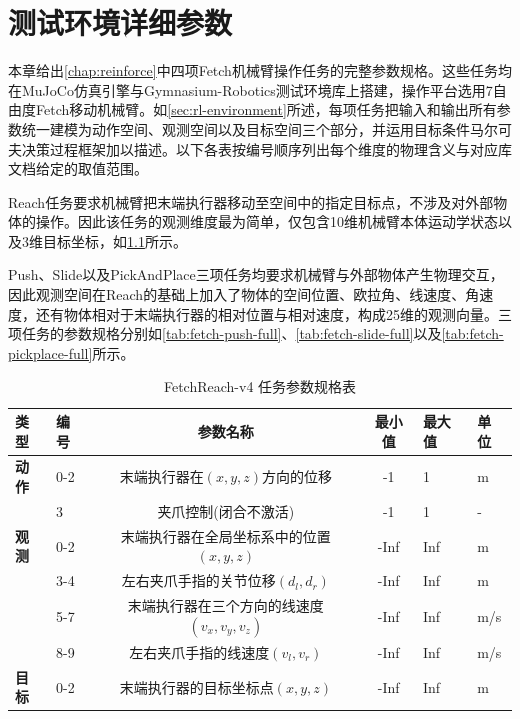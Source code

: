 \chapter{测试环境详细参数}\label{chap:detail-env}

本章给出\cref{chap:reinforce}中四项Fetch机械臂操作任务的完整参数规格。这些任务均在MuJoCo仿真引擎与Gymnasium-Robotics测试环境库上搭建，操作平台选用7自由度Fetch移动机械臂。如\cref{sec:rl-environment}所述，每项任务把输入和输出所有参数统一建模为动作空间、观测空间以及目标空间三个部分，并运用目标条件马尔可夫决策过程框架加以描述。以下各表按编号顺序列出每个维度的物理含义与对应库文档给定的取值范围。

Reach任务要求机械臂把末端执行器移动至空间中的指定目标点，不涉及对外部物体的操作。因此该任务的观测维度最为简单，仅包含10维机械臂本体运动学状态以及3维目标坐标，如\cref{tab:fetch-reach-full}所示。

Push、Slide以及PickAndPlace三项任务均要求机械臂与外部物体产生物理交互，因此观测空间在Reach的基础上加入了物体的空间位置、欧拉角、线速度、角速度，还有物体相对于末端执行器的相对位置与相对速度，构成25维的观测向量。三项任务的参数规格分别如\cref{tab:fetch-push-full}、\cref{tab:fetch-slide-full}以及\cref{tab:fetch-pickplace-full}所示。
\begin{table}[!htb]
  \caption{FetchReach-v4 任务参数规格表}\label{tab:fetch-reach-full}
  \centering
  \small
  \begin{tabular}{@{} llccll @{}} \toprule
    \textbf{类型} & \textbf{编号} & \textbf{参数名称} & \textbf{最小值} & \textbf{最大值} & \textbf{单位} \\ \midrule
    \textbf{动作} & 0-2 & 末端执行器在$(x, y, z)$方向的位移 & -1 & 1 & m \\
    & 3 & 夹爪控制(闭合不激活) & -1 & 1 & - \\ \midrule
    \textbf{观测} & 0-2 & 末端执行器在全局坐标系中的位置$(x, y, z)$ & -Inf & Inf & m \\
     & 3-4 & 左右夹爪手指的关节位移$(d_l, d_r)$ & -Inf & Inf & m \\
    & 5-7 & 末端执行器在三个方向的线速度$(v_x, v_y, v_z)$ & -Inf & Inf & m/s \\
    & 8-9 & 左右夹爪手指的线速度$(v_{l}, v_{r})$ & -Inf & Inf & m/s \\ \midrule
    \textbf{目标} & 0-2 & 末端执行器的目标坐标点$(x, y, z)$ & -Inf & Inf & m \\ \bottomrule
  \end{tabular}
\end{table}

